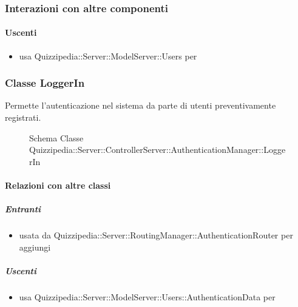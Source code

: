 \subsubsection{Interazioni con altre componenti}
\paragraph{Uscenti}
\begin{itemize}
\item usa Quizzipedia::Server::ModelServer::Users per 
\end{itemize}
\subsubsection{Classe LoggerIn}
Permette l'autenticazione nel sistema da parte di utenti preventivamente registrati.
\begin{figure}[H]
\centering
\noindent{}
\caption[Schema Classe LoggerIn]{Schema Classe Quizzipedia::Server::ControllerServer::AuthenticationManager::LoggerIn}
\end{figure}
\paragraph{Relazioni con altre classi}
\subparagraph{Entranti}
\begin{itemize}
\item usata da Quizzipedia::Server::RoutingManager::AuthenticationRouter per aggiungi
\end{itemize}
\subparagraph{Uscenti}
\begin{itemize}
\item usa Quizzipedia::Server::ModelServer::Users::AuthenticationData per 
\end{itemize}
